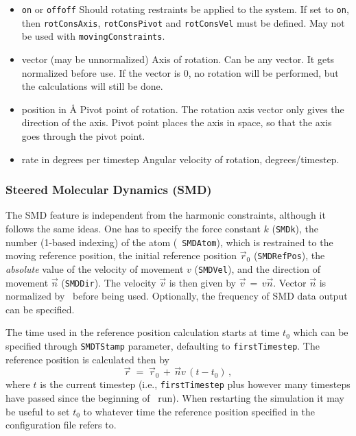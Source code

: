 \begin{itemize}

\item
{}
{{\tt on} or {\tt off}}{{\tt off}}
{Should rotating restraints be applied to the system. If set
to {\tt on}, then {\tt rotConsAxis}, {\tt rotConsPivot} and
{\tt rotConsVel} must be defined.
May not be used with {\tt movingConstraints}.}

\item
{}
{vector (may be unnormalized)}
{Axis of rotation. Can be any vector. It gets
normalized before use. If the vector is 0,
no rotation will be performed, but the calculations
will still be done.}

\item
{}
{position in \AA}
{Pivot point of rotation. The rotation axis vector
only gives the direction of the axis. Pivot point
places the axis in space, so that the axis goes
through the pivot point.}

\item
{}
{rate in degrees per timestep}
{Angular velocity of rotation, degrees/timestep.}

\end{itemize}


\subsubsection{Steered Molecular Dynamics (SMD)}

The SMD feature is independent from the harmonic constraints, although it
follows the same ideas. One has to specify the force constant $k$
({\tt SMDk}), the number (1-based indexing) of the atom ({\tt
SMDAtom}), which is restrained to the moving reference position, the
initial reference position $\vec r_0$ ({\tt SMDRefPos}), the {\em
absolute} value of the velocity of movement $v$ ({\tt SMDVel}), and
the direction of movement $\vec n$ ({\tt SMDDir}). The velocity $\vec
v$ is then given by $\vec v \, = \, v \vec n$. Vector $\vec n$ is
normalized by \NAMD\ before being used. Optionally, the frequency of
SMD data output can be specified. 

The time used in the reference position calculation starts at time
$t_0$ which can be specified through {\tt SMDTStamp} parameter,
defaulting to {\tt firstTimestep}. The reference position is
calculated then by 
\begin{equation}
  \vec r \; = \; \vec r_0 \, + \, \vec n v \, (t - t_0) \, ,
\end{equation}
where $t$ is the current timestep (i.e., {\tt firstTimestep} plus
however many timesteps have passed since the beginning of \NAMD\ run).
When restarting the simulation it may be useful to set $t_0$ to 
whatever time the reference position specified in the configuration
file refers to.

